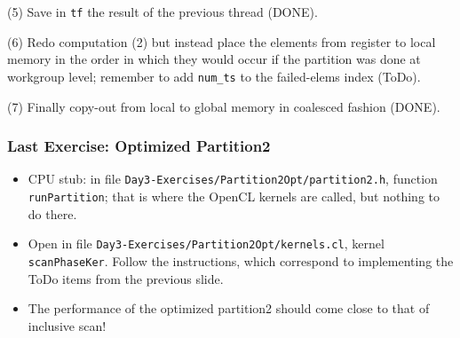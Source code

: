 \documentclass{beamer}
\begin{document}
\begin{frame}[fragile,t]
\begin{scriptsize}
\begin{itemize}
\begin{itemize}
\begin{scriptsize}
            \item[(5)] Save in {\tt tf} the result of the previous thread (DONE).\smallskip
            \item[(6)] Redo computation (2) but instead place the elements from 
                        register to local memory in the order in which they would occur
                        if the partition was done at workgroup level; remember to add 
                        {\tt num\_ts} to the failed-elems index (ToDo).\smallskip
            \item[(7)] Finally copy-out from local to global memory in coalesced fashion (DONE).
        \end{scriptsize}
        \end{itemize}
\end{itemize}
\end{scriptsize}
\end{frame}

\begin{frame}[fragile,t]
  \frametitle{Last Exercise: Optimized Partition2}

\begin{itemize}
    \item CPU stub: in file {\tt Day3-Exercises/Partition2Opt/partition2.h}, function {\tt runPartition};
            that is where the OpenCL kernels are called, but nothing to do there.\bigskip

    \item Open in file {\tt Day3-Exercises/Partition2Opt/kernels.cl}, kernel {\tt scanPhaseKer}. 
            Follow the instructions, which correspond to implementing the ToDo items from
            the previous slide.\bigskip

    \item The performance of the optimized partition2 should come close to that of inclusive scan!
\end{itemize}

\end{frame}
\end{document}
